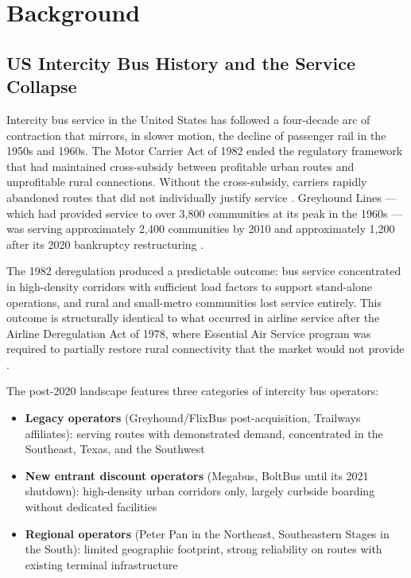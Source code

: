 \section{Background}

\subsection{US Intercity Bus History and the Service Collapse}

Intercity bus service in the United States has followed a four-decade arc of contraction that mirrors, in slower motion, the decline of passenger rail in the 1950s and 1960s. The Motor Carrier Act of 1982 ended the regulatory framework that had maintained cross-subsidy between profitable urban routes and unprofitable rural connections. Without the cross-subsidy, carriers rapidly abandoned routes that did not individually justify service \citep{Pisarski2006}. Greyhound Lines --- which had provided service to over 3,800 communities at its peak in the 1960s --- was serving approximately 2,400 communities by 2010 and approximately 1,200 after its 2020 bankruptcy restructuring \citep{Amtrak2023}.

The 1982 deregulation produced a predictable outcome: bus service concentrated in high-density corridors with sufficient load factors to support stand-alone operations, and rural and small-metro communities lost service entirely. This outcome is structurally identical to what occurred in airline service after the Airline Deregulation Act of 1978, where Essential Air Service program was required to partially restore rural connectivity that the market would not provide \citep{Winston2013}.

The post-2020 landscape features three categories of intercity bus operators:
\begin{itemize}
  \item \textbf{Legacy operators} (Greyhound/FlixBus post-acquisition, Trailways affiliates): serving routes with demonstrated demand, concentrated in the Southeast, Texas, and the Southwest
  \item \textbf{New entrant discount operators} (Megabus, BoltBus until its 2021 shutdown): high-density urban corridors only, largely curbside boarding without dedicated facilities
  \item \textbf{Regional operators} (Peter Pan in the Northeast, Southeastern Stages in the South): limited geographic footprint, strong reliability on routes with existing terminal infrastructure
\end{itemize}

